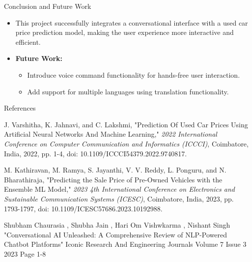 \documentclass{beamer}
\begin{document}
\begin{frame}[t]{Conclusion and Future Work}
    \begin{itemize}
        \item This project successfully integrates a conversational interface with a used car price prediction model, making the user experience more interactive and efficient.
        \item \textbf{Future Work:}
        \begin{itemize}
            \item Introduce voice command functionality for hands-free user interaction.
            \item Add support for multiple languages using translation functionality. 
        \end{itemize}
    \end{itemize}
\end{frame}

\begin{frame}[t]{References}
\begin{thebibliography}{9}
J. Varshitha, K. Jahnavi, and C. Lakshmi, "Prediction Of Used Car Prices Using Artificial Neural Networks And Machine Learning," \textit{2022 International Conference on Computer Communication and Informatics (ICCCI)}, Coimbatore, India, 2022, pp. 1-4, doi: 10.1109/ICCCI54379.2022.9740817.

M. Kathiravan, M. Ramya, S. Jayanthi, V. V. Reddy, L. Ponguru, and N. Bharathiraja, "Predicting the Sale Price of Pre-Owned Vehicles with the Ensemble ML Model," \textit{2023 4th International Conference on Electronics and Sustainable Communication Systems (ICESC)}, Coimbatore, India, 2023, pp. 1793-1797, doi: 10.1109/ICESC57686.2023.10192988.

Shubham Chaurasia , Shubha Jain , Hari Om Vishwkarma , Nishant Singh "Conversational AI Unleashed: A Comprehensive Review of NLP-Powered Chatbot Platforms" Iconic Research And Engineering Journals Volume 7 Issue 3 2023 Page 1-8


\end{thebibliography}
\end{frame}
\end{document}
